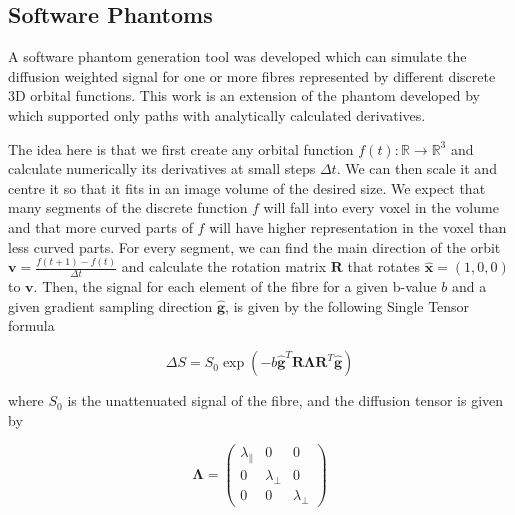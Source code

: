 \documentclass{bioinfo}
\begin{document}
\subsection{Software Phantoms\label{sub:Digital-Phantoms}}

A software phantom generation tool was developed which can simulate
the diffusion weighted signal for one or more fibres represented by
different discrete 3D orbital functions. This work is an extension
of the phantom developed by \citet{Correia2009} which
supported only paths with analytically calculated derivatives.

The idea here is that we first create any orbital function $f(t):\mathbb{R}\rightarrow\mathbb{R}^{3}$
and calculate numerically its derivatives at small steps $\Delta t$.
We can then scale it and centre it so that it fits in an image volume
of the desired size. We expect that many segments of the discrete
function $f$ will fall into every voxel in the volume and that more
curved parts of $f$ will have higher representation in the voxel
than less curved parts. For every segment, we can find the main direction
of the orbit $\mathbf{v}=\frac{f(t+1)-f(t)}{\Delta t}$ and calculate
the rotation matrix $\mathbf{R}$ that rotates $\hat{\mathbf{x}}=(1,0,0)$
to $\mathbf{v}$. Then, the signal for each element of the fibre for
a given b-value $b$ and a given gradient sampling direction $\hat{\mathbf{g}}$,
is given by the following Single Tensor formula

\begin{equation}
\Delta S=S_{0}\exp(-b\hat{\mathbf{g}}^{T}\mathbf{R}\bm{\Lambda}\mathbf{R}^{T}\hat{\mathbf{g}})\label{eq:step_signal}\end{equation}


\begin{flushleft}
where \foreignlanguage{british}{$S_{0}$ is the unattenuated signal
of the fibre, and the diffusion tensor is given by}
\par\end{flushleft}

\begin{center}
\begin{equation}
\bm{\Lambda}=\left(\begin{array}{ccc}
\lambda_{\parallel} & 0 & 0\\
0 & \lambda_{\perp} & 0\\
0 & 0 & \lambda_{\perp}\end{array}\right)\label{eq:step_tensor}\end{equation}

\par\end{center}
\end{document}
